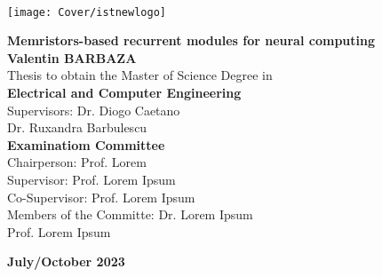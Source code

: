 \newcommand\blurredimage[3]{
  \node[opacity=0.2] at (#1) {\texttt{[image: \#3]}};
  \node[opacity=0.2] at (#1+ #2, #2) {\texttt{[image: \#3]}};
  \node[opacity=0.2] at (#1+-#2, #2) {\texttt{[image: \#3]}};
  \node[opacity=0.2] at (#1+-#2,-#2) {\texttt{[image: \#3]}};
  \node[opacity=0.2] at (#1+ #2,-#2) {\texttt{[image: \#3]}};
  }

  \setcounter{page}{1} 


  \thispagestyle{empty}

  \begin{flushleft}
    ~\\ \vspace{-12mm} \hspace{-12mm}
    \texttt{[image: Cover/istnewlogo]}
    \vspace{10mm}
    \\ \begin{center}
    \end{center} %

    \vspace{5mm}
    \centering
    \LARGE \textbf{Memristors-based recurrent modules for neural computing}
    \\ \vspace{15mm}
    \Large \textbf{Valentin BARBAZA} \\
    \vspace{12mm}
    \large Thesis to obtain the Master of Science Degree in
    \\ \vspace{2mm}
    \LARGE \textbf{Electrical and Computer Engineering}
    \\ \vspace{10mm}
    \large Supervisors: Dr. Diogo Caetano \\
    \large Dr. Ruxandra Barbulescu
    \\ \vspace{15mm}
    \Large \textbf{Examinatiom Committee}
    \\ \vspace{5mm}
    \large Chairperson: Prof. Lorem \\
    \large Supervisor: Prof. Lorem Ipsum\\
    \large Co-Supervisor: Prof. Lorem Ipsum \\
    \large Members of the Committe: Dr. Lorem Ipsum \\
    Prof. Lorem Ipsum

    \vspace{10mm}

    \Large \textbf{July/October 2023} \\
    \let\thepage\relax
  \end{flushleft}
